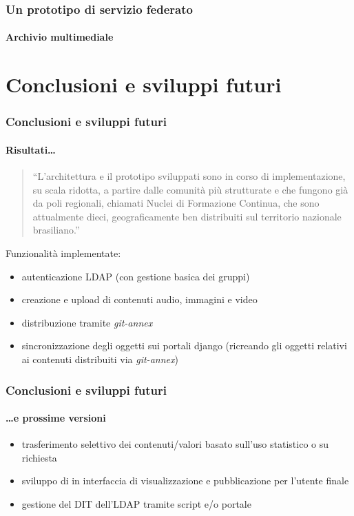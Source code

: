\documentclass{beamer}
\begin{document}
\begin{frame}
  \frametitle{Un prototipo di servizio federato}
  \framesubtitle{Archivio multimediale}

\end{frame}

\section{Conclusioni e sviluppi futuri}

\begin{frame}
 \frametitle{Conclusioni e sviluppi futuri}
  \framesubtitle{Risultati\ldots}
  \begin{quote}
    ``L'architettura e il prototipo sviluppati sono in corso di
    implementazione, su scala ridotta, a partire dalle comunità più
    strutturate e che fungono già da poli regionali, chiamati Nuclei
    di Formazione Continua, che sono attualmente dieci,
    geograficamente ben distribuiti sul territorio nazionale
    brasiliano.''
  \end{quote}
  
  Funzionalità implementate:
  \begin{itemize}
  \item autenticazione LDAP (con gestione basica dei gruppi)
  \item creazione e upload di contenuti audio, immagini e video
  \item distribuzione tramite \emph{git-annex}
  \item sincronizzazione degli oggetti sui portali django (ricreando
    gli oggetti relativi ai contenuti distribuiti via
    \emph{git-annex})
  \end{itemize}
\end{frame}
  
\begin{frame}
 \frametitle{Conclusioni e sviluppi futuri}
  \framesubtitle{\ldots e prossime versioni}
  
  \begin{itemize}
  \item trasferimento selettivo dei contenuti/valori basato sull'uso
    statistico o su richiesta
  \item sviluppo di in interfaccia di visualizzazione e pubblicazione
    per l'utente finale
  \item gestione del DIT dell'LDAP tramite script e/o portale
  \end{itemize}
\end{frame}
\end{document}
